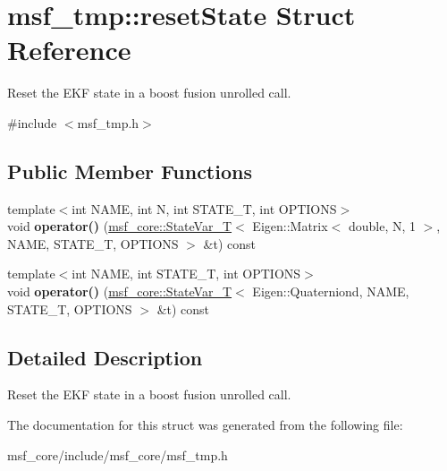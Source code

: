 \hypertarget{structmsf__tmp_1_1resetState}{\section{msf\-\_\-tmp\-:\-:reset\-State Struct Reference}
\label{structmsf__tmp_1_1resetState}
}


Reset the E\-K\-F state in a boost fusion unrolled call.  




{\ttfamily \#include $<$msf\-\_\-tmp.\-h$>$}

\subsection*{Public Member Functions}
\begin{DoxyCompactItemize}
\item 
\hypertarget{structmsf__tmp_1_1resetState_aa7e3525c8c9777ba163da0f64872eaca}{{\footnotesize template$<$int N\-A\-M\-E, int N, int S\-T\-A\-T\-E\-\_\-\-T, int O\-P\-T\-I\-O\-N\-S$>$ }\\void {\bfseries operator()} (\hyperlink{structmsf__core_1_1StateVar__T}{msf\-\_\-core\-::\-State\-Var\-\_\-\-T}$<$ Eigen\-::\-Matrix$<$ double, N, 1 $>$, N\-A\-M\-E, S\-T\-A\-T\-E\-\_\-\-T, O\-P\-T\-I\-O\-N\-S $>$ \&t) const }\label{structmsf__tmp_1_1resetState_aa7e3525c8c9777ba163da0f64872eaca}

\item 
\hypertarget{structmsf__tmp_1_1resetState_af31c01964acef3d4a598ee139b9e7013}{{\footnotesize template$<$int N\-A\-M\-E, int S\-T\-A\-T\-E\-\_\-\-T, int O\-P\-T\-I\-O\-N\-S$>$ }\\void {\bfseries operator()} (\hyperlink{structmsf__core_1_1StateVar__T}{msf\-\_\-core\-::\-State\-Var\-\_\-\-T}$<$ Eigen\-::\-Quaterniond, N\-A\-M\-E, S\-T\-A\-T\-E\-\_\-\-T, O\-P\-T\-I\-O\-N\-S $>$ \&t) const }\label{structmsf__tmp_1_1resetState_af31c01964acef3d4a598ee139b9e7013}

\end{DoxyCompactItemize}


\subsection{Detailed Description}
Reset the E\-K\-F state in a boost fusion unrolled call. 

The documentation for this struct was generated from the following file\-:\begin{DoxyCompactItemize}
\item 
msf\-\_\-core/include/msf\-\_\-core/msf\-\_\-tmp.\-h\end{DoxyCompactItemize}
